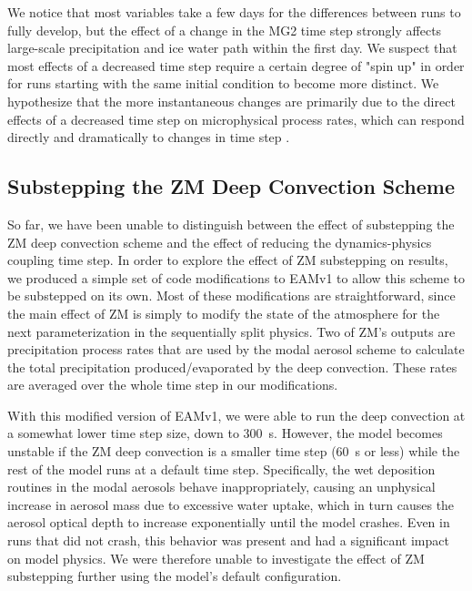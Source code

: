\documentclass [11pt, proquest] {uwthesis}[2020/02/24]
\begin{document}
We notice that most variables take a few days for the differences between runs to fully develop, but the effect of a change in the MG2 time step strongly affects large-scale precipitation and ice water path within the first day. We suspect that most effects of a decreased time step require a certain degree of "spin up" in order for runs starting with the same initial condition to become more distinct. We hypothesize that the more instantaneous changes are primarily due to the direct effects of a decreased time step on microphysical process rates, which can respond directly and dramatically to changes in time step \parencite{Santos2020}.

\subsection{Substepping the ZM Deep Convection Scheme}

\label{sec:zm-substep}

So far, we have been unable to distinguish between the effect of substepping the ZM deep convection scheme and the effect of reducing the dynamics-physics coupling time step. In order to explore the effect of ZM substepping on results, we produced a simple set of code modifications to EAMv1 to allow this scheme to be substepped on its own. Most of these modifications are straightforward, since the main effect of ZM is simply to modify the state of the atmosphere for the next parameterization in the sequentially split physics. Two of ZM's outputs are precipitation process rates that are used by the modal aerosol scheme to calculate the total precipitation produced/evaporated by the deep convection. These rates are averaged over the whole time step in our modifications.

With this modified version of EAMv1, we were able to run the deep convection at a somewhat lower time step size, down to \SI{300}{\second}. However, the model becomes unstable if the ZM deep convection is a smaller time step (\SI{60}{\second} or less) while the rest of the model runs at a default time step. Specifically, the wet deposition routines in the modal aerosols behave inappropriately, causing an unphysical increase in aerosol mass due to excessive water uptake, which in turn causes the aerosol optical depth to increase exponentially until the model crashes. Even in runs that did not crash, this behavior was present and had a significant impact on model physics. We were therefore unable to investigate the effect of ZM substepping further using the model's default configuration.
\end{document}
